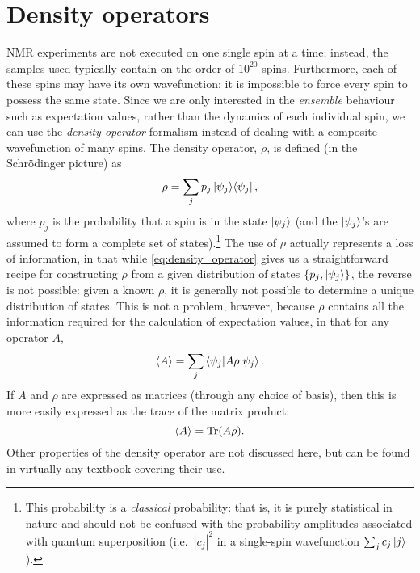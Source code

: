 \section{Density operators}
\label{sec:theory__density_operators}

NMR experiments are not executed on one single spin at a time; instead, the samples used typically contain on the order of $10^{20}$ spins.
Furthermore, each of these spins may have its own wavefunction: it is impossible to force every spin to possess the same state.
Since we are only interested in the \textit{ensemble} behaviour such as expectation values, rather than the dynamics of each individual spin, we can use the \textit{density operator} formalism instead of dealing with a composite wavefunction of many spins.
The density operator, $\rho$, is defined (in the Schr\"odinger picture) as
\begin{equation}
    \label{eq:density_operator}
    \rho = \sum_j p_j \ket{\psi_j}\!\bra{\psi_j},
\end{equation}
where $p_j$ is the probability that a spin is in the state $\ket{\psi_j}$ (and the $\ket{\psi_j}$'s are assumed to form a complete set of states).\footnote{This probability is a \textit{classical} probability: that is, it is purely statistical in nature and should not be confused with the probability amplitudes associated with quantum superposition (i.e.\ $|c_j|^2$ in a single-spin wavefunction $\sum_j c_j \ket{j}$).}
The use of $\rho$ actually represents a loss of information, in that while \cref{eq:density_operator} gives us a straightforward recipe for constructing $\rho$ from a given distribution of states $\{p_j, \ket{\psi_j}\}$, the reverse is not possible: given a known $\rho$, it is generally not possible to determine a unique distribution of states.
This is not a problem, however, because $\rho$ contains all the information required for the calculation of expectation values, in that for any operator $A$,
\begin{equation}
    \label{eq:density_expectation}
    \langle A \rangle = \sum_j \braket{\psi_j | A\rho | \psi_j}.
\end{equation}
If $A$ and $\rho$ are expressed as matrices (through any choice of basis), then this is more easily expressed as the trace of the matrix product:
\begin{equation}
    \label{eq:density_trace}
    \langle A \rangle = \operatorname{Tr}(A\rho).
\end{equation}
Other properties of the density operator are not discussed here, but can be found in virtually any textbook covering their use.\autocite{Blum2012,CohenTannoudji2020,Sakurai2021}


